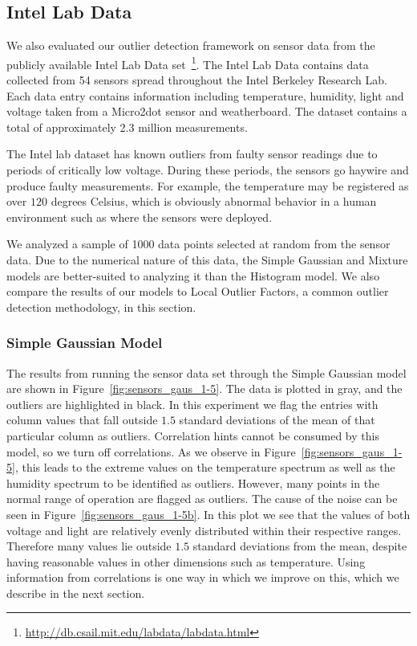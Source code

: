 \subsection{Intel Lab Data}
\label{sec:intel-lab-data-evaluation}

We also evaluated our outlier detection framework on sensor data from the publicly available Intel Lab Data set~\footnote{\url{http://db.csail.mit.edu/labdata/labdata.html}}. The Intel Lab Data contains data collected from 54 sensors spread throughout the Intel Berkeley Research Lab. Each data entry contains information including temperature, humidity, light and voltage taken from a Micro2dot sensor and weatherboard. The dataset contains a total of approximately 2.3 million measurements.

The Intel lab dataset has known outliers from faulty sensor readings due to periods of critically low voltage. During these periods, the sensors go haywire and produce faulty measurements.
For example, the temperature may be registered as over $120$ degrees Celsius, which is obviously abnormal behavior in a human environment such as where the sensors were deployed.
 
We analyzed a sample of 1000 data points selected at random from the sensor data. 
Due to the numerical nature of this data, the Simple Gaussian and Mixture models are better-suited to analyzing it than the Histogram model.
We also compare the results of our models to Local Outlier Factors, a common outlier detection methodology, in this section.
 
\subsubsection{Simple Gaussian Model}

The results from running the sensor data set through the Simple Gaussian model are shown in Figure~\ref{fig:sensors_gaus_1-5}.
The data is plotted in gray, and the outliers are highlighted in black.
In this experiment we flag the entries with column values that fall outside $1.5$ standard deviations of the mean of that particular column as outliers.
Correlation hints cannot be consumed by this model, so we turn off correlations.
As we observe in Figure~\ref{fig:sensors_gaus_1-5}, this leads to the extreme values on the temperature spectrum as well as the humidity spectrum to be identified as outliers.
However, many points in the normal range of operation are flagged as outliers.
The cause of the noise can be seen in Figure~\ref{fig:sensors_gaus_1-5b}.
In this plot we see that the values of both voltage and light are relatively evenly distributed within their respective ranges.
Therefore many values lie outside $1.5$ standard deviations from the mean, despite having reasonable values in other dimensions such as temperature.
Using information from correlations is one way in which we improve on this, which we describe in the next section.


